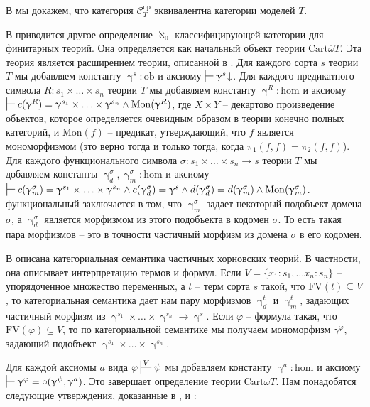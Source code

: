 \documentclass[reqno]{amsart}
\theoremstyle{definition}
\theoremstyle{remark}
\newcommand{\cat}[1]{\mathcal{#1}}
\newcommand{\fs}[1]{\mathrm{#1}}
\newcommand{\FV}{\fs{FV}}
\begin{document}
\begin{remark}
В  мы докажем, что категория $\cat{C}_T^\fs{op}$ эквивалентна категории моделей $T$.
\end{remark}

В \cite{PHL} приводится другое определение $\aleph_0$-классифицирующей категории для финитарных теорий.
Она определяется как начальный объект теории $\mathrm{Cart} \overline{\omega} T$.
Эта теория является расширением теории, описанной в .
Для каждого сорта $s$ теории $T$ мы добавляем константу $\upgamma^s : \fs{ob}$ и аксиому $\sststile{}{} \upgamma^s\!\downarrow$.
Для каждого предикатного символа $R : s_1 \times \ldots \times s_n$ теории $T$ мы добавляем константу $\upgamma^R : \fs{hom}$
и аксиому $\sststile{}{} c(\upgamma^R) = \upgamma^{s_1} \times \ldots \times \upgamma^{s_n} \land \fs{Mon}(\upgamma^R)$,
где $X \times Y$ -- декартово произведение объектов, которое определяется очевидным образом в теории конечно полных категорий, и $\fs{Mon}(f)$ -- предикат,
утверждающий, что $f$ является мономорфизмом (это верно тогда и только тогда, когда $\pi_1(f,f) = \pi_2(f,f)$).
Для каждого функционального символа $\sigma : s_1 \times \ldots \times s_n \to s$ теории $T$ мы добавляем константы $\upgamma^\sigma_d, \upgamma^\sigma_m : \fs{hom}$ и аксиому
$\sststile{}{} c(\upgamma^\sigma_m) = \upgamma^{s_1} \times \ldots \times \upgamma^{s_n} \land c(\upgamma^\sigma_d) = \upgamma^s \land d(\upgamma^\sigma_d) = d(\upgamma^\sigma_m) \land \fs{Mon}(\upgamma^\sigma_m)$.
функциональный заключается в том, что $\upgamma^\sigma_m$ задает некоторый подобъект домена $\sigma$, а $\upgamma^\sigma_d$ является морфизмом из этого подобъекта в кодомен $\sigma$.
То есть такая пара морфизмов -- это в точности частичный морфизм из домена $\sigma$ в его кодомен.

В \cite[Section~8]{PHL} описана категориальная семантика частичных хорновских теорий.
В частности, она описывает интерпретацию термов и формул.
Если $V = \{ x_1 : s_1, \ldots x_n : s_n \}$ -- упорядоченное множество переменных, а $t$ -- терм сорта $s$ такой, что $\FV(t) \subseteq V$,
то категориальная семантика дает нам пару морфизмов $\upgamma^t_d$ и $\upgamma^t_m$, задающих частичный морфизм из $\upgamma^{s_1} \times \ldots \times \upgamma^{s_n} \to \upgamma^s$.
Если $\varphi$ -- формула такая, что $\FV(\varphi) \subseteq V$, то по категориальной семантике мы получаем мономорфизм $\gamma^\varphi$, задающий подобъект $\upgamma^{s_1} \times \ldots \times \upgamma^{s_n}$.

Для каждой аксиомы $a$ вида $\varphi \sststile{}{V} \psi$ мы добавляем константу $\upgamma^a : \fs{hom}$ и аксиому $\sststile{}{} \upgamma^\varphi = \circ(\upgamma^\psi,\upgamma^a)$.
Это завершает определение теории $\mathrm{Cart} \overline{\omega} T$.
Нам понадобятся следующие утверждения, доказанные в \cite[Lemma~39]{PHL}, \cite[Lemma~40]{PHL} и \cite[Theorem~41]{PHL}:
\end{document}
